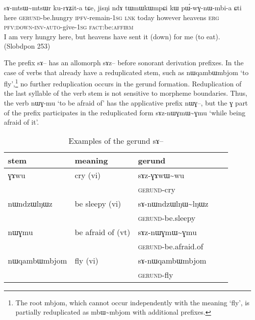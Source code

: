 \documentclass[oldfontcommands,oneside,a4paper,11pt]{article}
\newcommand{\ipa}[1]{{\phon \mbox{#1}}} %
\begin{document}
\begin{exe}
\ex \label{ex:sAmtsWmtsWr}
\gll  \ipa{kutɕu}  	\ipa{sɤ-mtsɯ\textasciitilde{}mtsɯr}  	\ipa{ku-rɤʑit-a}  	\ipa{tɕe,}  	\ipa{jisŋi}  	\ipa{ndɤ}  	\ipa{tɯmɯkɯmpɕi}  	\ipa{kɯ}  	\ipa{pɯ́-wɣ-nɯ-mbi-a}  	\ipa{ɕti}  \\
 here \textsc{gerund}-be.hungry \textsc{ipfv}-remain-\textsc{1sg} \textsc{lnk} today however heavens \textsc{erg} \textsc{pfv:down-inv-auto}-give-\textsc{1sg} \textsc{fact}:be:\textsc{affirm} \\
\glt I am very hungry here, but heavens have sent it (down) for  me (to eat). (Slobdpon 253)
\end{exe}

The prefix \ipa{sɤ}-- has an allomorph \ipa{sɤz}-- before sonorant derivation prefixes.  In the case of verbs that already have a reduplicated stem, such as \ipa{nɯqambɯmbjom} `to fly',\footnote{The root \ipa{mbjom}, which cannot occur independently with the meaning `fly', is partially reduplicated as \ipa{mbɯ\textasciitilde{}mbjom} with additional prefixes.} no further reduplication occurs in the gerund formation. Reduplication of the last syllable of the verb stem is not sensitive to morpheme boundaries. Thus, the verb \ipa{nɯɣ-mu} `to be afraid of' has the applicative prefix \ipa{nɯɣ}--, but the \ipa{ɣ} part of the prefix participates in the reduplicated form \ipa{sɤz-nɯɣmɯ\textasciitilde{}ɣmu} `while being afraid of it'.

\begin{table}[h]
\caption{Examples of the gerund \ipa{sɤ}--} \label{tab:gerund}
\begin{tabular}{lllll}
\toprule
stem & meaning & gerund \\
\midrule
\ipa{ɣɤwu}& cry (vi)& \ipa{sɤz-ɣɤwɯ\textasciitilde{}wu}\\
&&\textsc{gerund}-cry \\
\ipa{nɯndzɯlŋɯz}& be sleepy (vi)& \ipa{sɤ-nɯndzɯlŋɯ\textasciitilde{}lŋɯz}\\
&&\textsc{gerund}-be.sleepy \\
\ipa{nɯɣmu}& be afraid of (vt)& \ipa{sɤz-nɯɣmɯ\textasciitilde{}ɣmu}\\
&&\textsc{gerund}-be.afraid.of \\
\midrule
\ipa{nɯqambɯmbjom} & fly (vi) &\ipa{sɤ-nɯqambɯmbjom} \\
&&\textsc{gerund}-fly \\
\bottomrule
\end{tabular}
\end{table}
\end{document}
